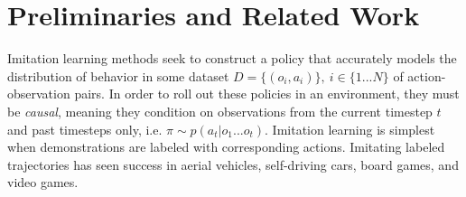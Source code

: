 \section{Preliminaries and Related Work}
\label{section:related}
\vspace{-2px}

Imitation learning methods \cite{pomerleau1988alvinn, schaal1999imitation, argall2009survey, hussein2017imitation} seek to construct a policy that accurately models the distribution of behavior in some dataset $D = \{(o_i, a_i)\}, ~ i \in \{1...N\}$ of action-observation pairs. In order to roll out these policies in an environment, they must be \emph{causal}, meaning they condition on observations from the current timestep $t$ and past timesteps only, i.e. $\pi \sim p(a_t | o_1...o_t)$. Imitation learning is simplest when demonstrations are labeled with corresponding actions. Imitating labeled trajectories has seen success in aerial vehicles, \cite{sammut1992learning, giusti2015machine} self-driving cars, \cite{bojarski2016end, codevilla2018end} board games, \cite{coulom2007computing, silver2016mastering} and video games.\cite{hester2018deep, vinyals2019grandmaster}


